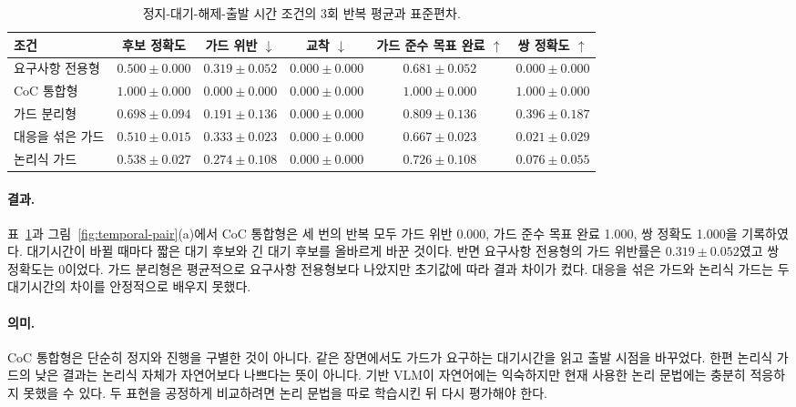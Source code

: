 \begin{table}[!t]
\centering
\caption{정지-대기-해제-출발 시간 조건의 3회 반복 평균과 표준편차.}
\label{tab:temporal}
\footnotesize
\begin{tabular}{lccccc}
\toprule
조건 & 후보 정확도 & 가드 위반 $\downarrow$ & 교착 $\downarrow$ & 가드 준수 목표 완료 $\uparrow$ & 쌍 정확도 $\uparrow$ \\
\midrule
요구사항 전용형 & $0.500\pm0.000$ & $0.319\pm0.052$ & $0.000\pm0.000$ & $0.681\pm0.052$ & $0.000\pm0.000$ \\
CoC 통합형 & $\mathbf{1.000\pm0.000}$ & $\mathbf{0.000\pm0.000}$ & $0.000\pm0.000$ & $\mathbf{1.000\pm0.000}$ & $\mathbf{1.000\pm0.000}$ \\
가드 분리형 & $0.698\pm0.094$ & $0.191\pm0.136$ & $0.000\pm0.000$ & $0.809\pm0.136$ & $0.396\pm0.187$ \\
대응을 섞은 가드 & $0.510\pm0.015$ & $0.333\pm0.023$ & $0.000\pm0.000$ & $0.667\pm0.023$ & $0.021\pm0.029$ \\
논리식 가드 & $0.538\pm0.027$ & $0.274\pm0.108$ & $0.000\pm0.000$ & $0.726\pm0.108$ & $0.076\pm0.055$ \\
\bottomrule
\end{tabular}
\end{table}

\paragraph{결과.}
표~\ref{tab:temporal}과 그림~\ref{fig:temporal-pair}(a)에서 CoC 통합형은 세 번의 반복 모두 가드 위반 0.000, 가드 준수 목표 완료 1.000, 쌍 정확도 1.000을 기록하였다. 대기시간이 바뀔 때마다 짧은 대기 후보와 긴 대기 후보를 올바르게 바꾼 것이다. 반면 요구사항 전용형의 가드 위반률은 $0.319\pm0.052$였고 쌍 정확도는 0이었다. 가드 분리형은 평균적으로 요구사항 전용형보다 나았지만 초기값에 따라 결과 차이가 컸다. 대응을 섞은 가드와 논리식 가드는 두 대기시간의 차이를 안정적으로 배우지 못했다.

\paragraph{의미.}
CoC 통합형은 단순히 정지와 진행을 구별한 것이 아니다. 같은 장면에서도 가드가 요구하는 대기시간을 읽고 출발 시점을 바꾸었다. 한편 논리식 가드의 낮은 결과는 논리식 자체가 자연어보다 나쁘다는 뜻이 아니다. 기반 VLM이 자연어에는 익숙하지만 현재 사용한 논리 문법에는 충분히 적응하지 못했을 수 있다. 두 표현을 공정하게 비교하려면 논리 문법을 따로 학습시킨 뒤 다시 평가해야 한다.

